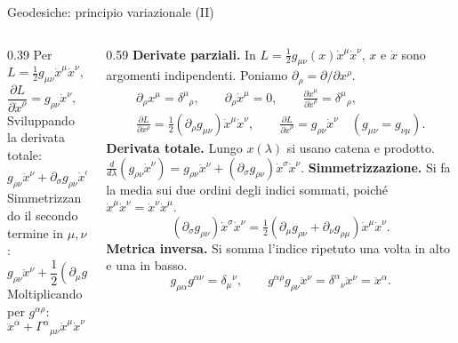 \begin{frame}[t]{Geodesiche: principio variazionale (II)}\small\raggedright
\begin{columns}[T]
    \begin{column}{0.39\textwidth}
Per $L=\tfrac12g_{\mu\nu}\dot x^\mu\dot x^\nu$,
\[
\frac{\partial L}{\partial\dot x^\rho}=g_{\rho\nu}\dot x^\nu,
\qquad
\frac{\partial L}{\partial x^\rho}
=\frac12\partial_\rho g_{\mu\nu}\dot x^\mu\dot x^\nu.
\]
Sviluppando la derivata totale:
\[
g_{\rho\nu}\ddot x^\nu+
\partial_\sigma g_{\rho\nu}\dot x^\sigma\dot x^\nu
-\frac12\partial_\rho g_{\mu\nu}\dot x^\mu\dot x^\nu=0.
\]
Simmetrizzando il secondo termine in $\mu,\nu$:
\[
g_{\rho\nu}\ddot x^\nu+
\frac12(\partial_\mu g_{\rho\nu}+\partial_\nu g_{\rho\mu}-\partial_\rho g_{\mu\nu})\dot x^\mu\dot x^\nu=0.
\]
Moltiplicando per $g^{\alpha\rho}$:
\[
\ddot x^\alpha+\Gamma^\alpha{}_{\mu\nu}\dot x^\mu\dot x^\nu=0.
\]
    \end{column}
    \begin{column}{0.59\textwidth}
\textbf{Derivate parziali.} In \(L=\tfrac12 g_{\mu\nu}(x)\dot x^\mu\dot x^\nu\),
\(x\) e \(\dot x\) sono argomenti indipendenti. Poniamo \(\partial_\rho=\partial/\partial x^\rho\).
\[
\begin{gathered}
  \partial_\rho x^\mu=\delta^\mu{}_{\rho},\qquad
  \partial_\rho\dot x^\mu=0,\qquad
  \frac{\partial\dot x^\mu}{\partial\dot x^\rho}=\delta^\mu{}_{\rho},\\[3pt]
  \frac{\partial L}{\partial x^\rho}
    =\tfrac12(\partial_\rho g_{\mu\nu})\dot x^\mu\dot x^\nu,\qquad
  \frac{\partial L}{\partial\dot x^\rho}=g_{\rho\nu}\dot x^\nu
  \quad (g_{\mu\nu}=g_{\nu\mu}).
\end{gathered}
\]
\textbf{Derivata totale.} Lungo \(x(\lambda)\) si usano catena e prodotto. $\frac{d}{d\lambda}(g_{\rho\nu}\dot x^\nu)=g_{\rho\nu}\ddot x^\nu+(\partial_\sigma g_{\rho\nu})\dot x^\sigma\dot x^\nu$.
\textbf{Simmetrizzazione.} Si fa la media sui due ordini degli indici sommati, poich\'e \(\dot x^\mu\dot x^\nu=\dot x^\nu\dot x^\mu\).
\[
(\partial_\sigma g_{\rho\nu})\dot x^\sigma\dot x^\nu
=\tfrac12(\partial_\mu g_{\rho\nu}+\partial_\nu g_{\rho\mu})
  \dot x^\mu\dot x^\nu.
\]
\textbf{Metrica inversa.} Si somma l'indice ripetuto una volta in alto e una in basso.
\[
g_{\mu\alpha}g^{\alpha\nu}=\delta_\mu{}^\nu,\qquad
g^{\alpha\rho}g_{\rho\nu}\ddot x^\nu
  =\delta^\alpha{}_{\nu}\ddot x^\nu=\ddot x^\alpha.
\]
    \end{column}
\end{columns}
\medskip
\begin{columns}[T,onlytextwidth]

\end{columns}
\end{frame}
